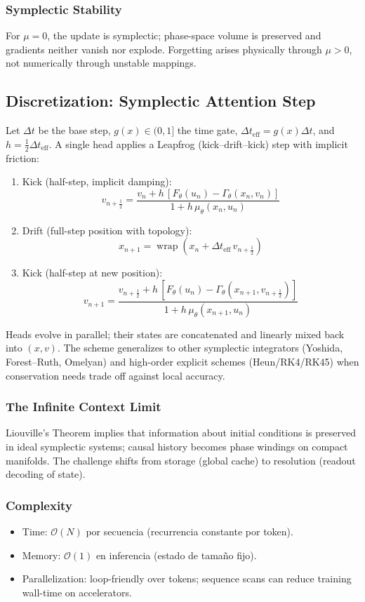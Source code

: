 \documentclass{article}
\numberwithin{equation}{section}
\begin{document}
\subsubsection{Symplectic Stability}
For $\mu=0$, the update is symplectic; phase-space volume is preserved and gradients neither vanish nor explode. Forgetting arises physically through $\mu>0$, not numerically through unstable mappings.

\subsection{Discretization: Symplectic Attention Step}
Let $\Delta t$ be the base step, $g(x)\in(0,1]$ the time gate, $\Delta t_{\text{eff}} = g(x)\Delta t$, and $h=\tfrac{1}{2}\Delta t_{\text{eff}}$. A single head applies a Leapfrog (kick–drift–kick) step with implicit friction:
\begin{enumerate}
\item Kick (half-step, implicit damping):
\[
v_{n+\tfrac{1}{2}} = \frac{v_n + h\,[F_\theta(u_n) - \Gamma_\theta(x_n, v_n)]}{1 + h\,\mu_\theta(x_n, u_n)}
\]
\item Drift (full-step position with topology):
\[
x_{n+1} = \operatorname{wrap}\!\left(x_n + \Delta t_{\text{eff}}\, v_{n+\tfrac{1}{2}}\right)
\]
\item Kick (half-step at new position):
\[
v_{n+1} = \frac{v_{n+\tfrac{1}{2}} + h\,[F_\theta(u_n) - \Gamma_\theta(x_{n+1}, v_{n+\tfrac{1}{2}})]}{1 + h\,\mu_\theta(x_{n+1}, u_n)}
\]
\end{enumerate}
Heads evolve in parallel; their states are concatenated and linearly mixed back into $(x, v)$. The scheme generalizes to other symplectic integrators (Yoshida, Forest–Ruth, Omelyan) and high-order explicit schemes (Heun/RK4/RK45) when conservation needs trade off against local accuracy.

\subsubsection{The Infinite Context Limit}
Liouville’s Theorem implies that information about initial conditions is preserved in ideal symplectic systems; causal history becomes phase windings on compact manifolds. The challenge shifts from storage (global cache) to resolution (readout decoding of state).

\subsubsection{Complexity}
\begin{itemize}
\item Time: $\mathcal{O}(N)$ por secuencia (recurrencia constante por token).
\item Memory: $\mathcal{O}(1)$ en inferencia (estado de tamaño fijo).
\item Parallelization: loop-friendly over tokens; sequence scans can reduce training wall-time on accelerators.
\end{itemize}
\end{document}
